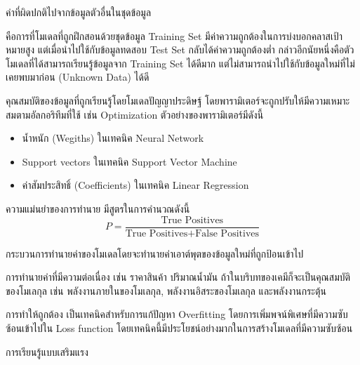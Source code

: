 \begin{description}[style=nextline]
    \item[Outlier] ค่าที่ผิดปกติไปจากข้อมูลตัวอื่นในชุดข้อมูล

    \item[Overfitting] คือการที่โมเดลที่ถูกฝึกสอนด้วยชุดข้อมูล Training Set มีค่าความถูกต้องในการบ่งบอกคลาสเป้าหมายสูง 
    แต่เมื่อนำไปใช้กับข้อมูลทดสอบ Test Set กลับได้ค่าความถูกต้องต่ำ กล่าวอีกนัยหนึ่งคือตัวโมเดลที่ได้สามารถเรียนรู้ข้อมูลจาก Training Set 
    ได้ดีมาก แต่ไม่สามารถนำไปใช้กับข้อมูลใหม่ที่ไม่เคยพบมาก่อน (Unknown Data) ได้ดี

    \item[Parameter] คุณสมบัติของข้อมูลที่ถูกเรียนรู้โดยโมเดลปัญญาประดิษฐ์ โดยพารามิเตอร์จะถูกปรับให้มีความเหมาะสมตามอัลกอริทึมที่ใช้
    เช่น Optimization ตัวอย่างของพารามิเตอร์มีดังนี้
    \begin{itemize}
        \item น้ำหนัก (Wegiths) ในเทคนิค Neural Network
        \item Support vectors ในเทคนิค Support Vector Machine
        \item ค่าสัมประสิทธิ์ (Coefficients) ในเทคนิค Linear Regression
    \end{itemize}

    \item[Precision] ความแม่นยำของการทำนาย มีสูตรในการคำนวณดังนี้
    \begin{equation}\label{eq:precision}
        P = \frac{\text{True Positives}}{\text{True Positives} + \text{False Positives}}
    \end{equation}

    \item[Prediction] กระบวนการทำนายค่าของโมเดลโดยจะทำนายค่าเอาต์พุตของข้อมูลใหม่ที่ถูกป้อนเข้าไป

    \item[Regression]  การทำนายค่าที่มีความต่อเนื่อง เช่น ราคาสินค้า ปริมาณน้ำมัน ถ้าในบริบทของเคมีก็จะเป็นคุณสมบัติของโมเลกุล 
    เช่น พลังงานภายในของโมเลกุล, พลังงานอิสระของโมเลกุล และพลังงานกระตุ้น

    \item[Regularization] การทำให้ถูกต้อง เป็นเทคนิคสำหรับการแก้ปัญหา Overfitting โดยการเพิ่มพจน์พิเศษที่มีความซับซ้อนเข้าไปใน 
    Loss function โดยเทคนิคนี้มีประโยชน์อย่างมากในการสร้างโมเดลที่มีความซับซ้อน

    \item[Reinforment Learning] การเรียนรู้แบบเสริมแรง 


\end{description}
